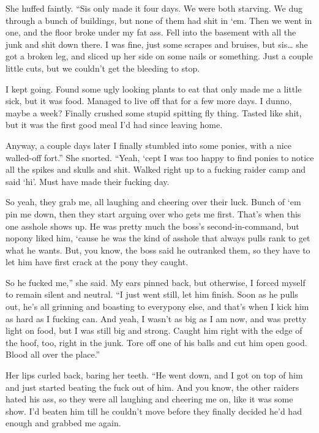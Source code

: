 She huffed faintly. “Sis only made it four days. We were both starving. We dug through a bunch of buildings, but none of them had shit in ‘em. Then we went in one, and the floor broke under my fat ass. Fell into the basement with all the junk and shit down there. I was fine, just some scrapes and bruises, but sis… she got a broken leg, and sliced up her side on some nails or something. Just a couple little cuts, but we couldn’t get the bleeding to stop.

\leavevmode{}I kept going. Found some ugly looking plants to eat that only made me a little sick, but it was food. Managed to live off that for a few more days. I dunno, maybe a week? Finally crushed some stupid spitting fly thing. Tasted like shit, but it was the first good meal I’d had since leaving home.

\leavevmode{}Anyway, a couple days later I finally stumbled into some ponies, with a nice walled-off fort.” She snorted. “Yeah, ‘cept I was too happy to find ponies to notice all the spikes and skulls and shit. Walked right up to a fucking raider camp and said ‘hi’. Must have made their fucking day.

\leavevmode{}So yeah, they grab me, all laughing and cheering over their luck. Bunch of ‘em pin me down, then they start arguing over who gets me first. That’s when this one asshole shows up. He was pretty much the boss’s second-in-command, but nopony liked him, ‘cause he was the kind of asshole that always pulls rank to get what he wants. But, you know, the boss said he outranked them, so they have to let him have first crack at the pony they caught.

\leavevmode{}So he fucked me,” she said. My ears pinned back, but otherwise, I forced myself to remain silent and neutral. “I just went still, let him finish. Soon as he pulls out, he’s all grinning and boasting to everypony else, and that’s when I kick him as hard as I fucking can. And yeah, I wasn’t as big as I am now, and was pretty light on food, but I was still big and strong. Caught him right with the edge of the hoof, too, right in the junk. Tore off one of his balls and cut him open good. Blood all over the place.”

Her lips curled back, baring her teeth. “He went down, and I got on top of him and just started beating the fuck out of him. And you know, the other raiders hated his ass, so they were all laughing and cheering me on, like it was some show. I’d beaten him till he couldn’t move before they finally decided he’d had enough and grabbed me again.

